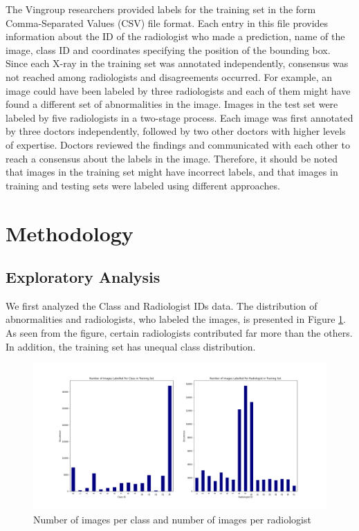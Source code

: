\documentclass[conference]{IEEEtran}
\begin{document}
The Vingroup researchers provided labels for the training set in the form Comma-Separated Values (CSV) file format. Each entry in this file provides information about the ID of the radiologist who made a prediction, name of the image, class ID and coordinates specifying the position of the bounding box. Since each X-ray in the training set was annotated independently, consensus was not reached among radiologists and disagreements occurred. For example, an image could have been labeled by three radiologists and each of them might have found a different set of abnormalities in the image. Images in the test set were labeled by five radiologists in a two-stage process. Each image was first annotated by three doctors independently, followed by two other doctors with higher levels of expertise. Doctors reviewed the findings and communicated with each other to reach a consensus about the labels in the image. Therefore, it should be noted that images in the training set might have incorrect labels, and that images in training and testing sets were labeled using different approaches.

\section{Methodology} \label{methodology}
\subsection{Exploratory Analysis}
We first analyzed the Class and Radiologist IDs data. The distribution of abnormalities and radiologists, who labeled the images, is presented in Figure \ref{fig:numImages}. As seen from the figure, certain radiologists contributed far more than the others. In addition, the training set has unequal class distribution. 
\begin{figure}[h]
	\centering
    \includegraphics[width=0.80\linewidth]{NumImagesPerClassAndRad}
    \caption{Number of images per class and number of images per radiologist}
	\label{fig:numImages}
\end{figure}
\end{document}
